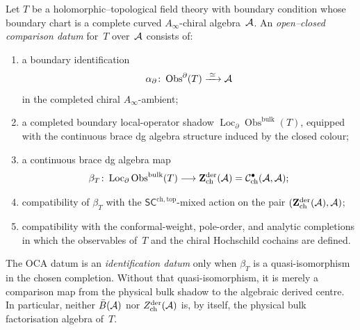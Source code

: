 \begin{definition}
\label{def:thqg-oca-datum}
Let \(T\) be a holomorphic--topological field theory with boundary
condition whose boundary chart is a complete curved
\(A_\infty\)-chiral algebra~\(\mathcal{A}\). An
\emph{open--closed comparison datum} for~\(T\) over~\(\mathcal{A}\) consists
of:
\begin{enumerate}[label=\textup{(\roman*)}]
\item a boundary identification
 \[
 \alpha_\partial\colon
 \operatorname{Obs}^{\partial}(T)\xrightarrow{\;\simeq\;}\mathcal{A}
 \]
 in the completed chiral \(A_\infty\)-ambient;
\item a completed boundary local-operator shadow
 \(\operatorname{Loc}_{\partial}
 \operatorname{Obs}^{\mathrm{bulk}}(T)\), equipped with the
 continuous brace dg algebra structure induced by the closed colour;
\item a continuous brace dg algebra map
 \begin{equation}\label{eq:thqg-oca-map}
 \beta_T\colon
 \operatorname{Loc}_{\partial}\operatorname{Obs}^{\mathrm{bulk}}(T)
 \longrightarrow
 \mathbf{Z}^{\mathrm{der}}_{\mathrm{ch}}(\mathcal{A})
 =
 \mathcal{C}^{\bullet}_{\mathrm{ch}}(\mathcal{A},\mathcal{A});
 \end{equation}
\item compatibility of \(\beta_T\) with the
 \(\mathsf{SC}^{\mathrm{ch,top}}\)-mixed action on the pair
 \((\mathbf{Z}^{\mathrm{der}}_{\mathrm{ch}}(\mathcal{A}),\mathcal{A})\);
\item compatibility with the conformal-weight, pole-order, and
 analytic completions in which the observables of~\(T\) and the
 chiral Hochschild cochains are defined.
\end{enumerate}
The OCA datum is an \emph{identification datum} only when
\(\beta_T\) is a quasi-isomorphism in the chosen completion. Without
that quasi-isomorphism, it is merely a comparison map from the physical
bulk shadow to the algebraic derived centre. In particular, neither
\(\bar B(\mathcal{A})\) nor \(Z^{\mathrm{der}}_{\mathrm{ch}}(\mathcal{A})\) is, by
itself, the physical bulk factorisation algebra of~\(T\).
\end{definition}

